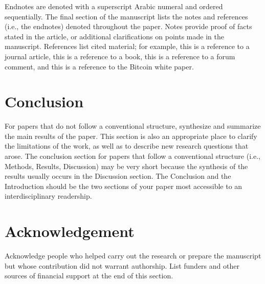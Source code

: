 \documentclass{ledger}
\begin{document}
Endnotes are denoted with a superscript Arabic numeral and ordered sequentially.  The final section of the manuscript lists the notes and references (i.e., the endnotes) denoted throughout the paper.  Notes provide proof of facts stated in the article, or additional clarifications on points made in the manuscript.  References list cited material; for example, this is a reference to a journal article, this is a reference to a book, this is a reference to a forum comment, and this is a reference to the Bitcoin white paper.

\section{Conclusion}

For papers that do not follow a conventional structure, synthesize and summarize the main results of the paper.  This section is also an appropriate place to clarify the limitations of the work, as well as to describe new research questions that arose.  The conclusion section for papers that follow a conventional structure (i.e., Methods, Results, Discussion) may be very short because the synthesis of the results usually occurs in the Discussion section.  The Conclusion and the Introduction should be the two sections of your paper most accessible to an interdisciplinary readership.



\ledgernotes

\section{Acknowledgement}

Acknowledge people who helped carry out the research or prepare the manuscript but whose contribution did not warrant authorship.  List funders and other sources of financial support at the end of this section.  
\end{document}
